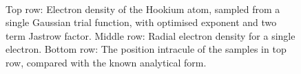 \documentclass[final,3p,times,twocolumn]{elsarticle}
\begin{document}
\begin{figure}
		 \\
		\caption{Top row: Electron density of the Hookium atom, sampled from a single Gaussian trial function, with optimised exponent and two term Jastrow factor. Middle row: Radial electron density for a single electron. Bottom row: The position intracule of the samples in top row, compared with the known analytical form.}
		\label{fig:wfsandpints}
	\end{figure}
\end{document}
